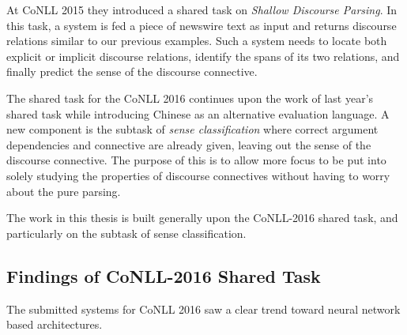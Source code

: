 At CoNLL 2015 they introduced a shared task on \emph{Shallow Discourse Parsing}. In this task, a system is fed a piece of newswire text as input and returns discourse relations similar to our previous examples. Such a system needs to locate both explicit or implicit discourse relations, identify the spans of its two relations, and finally predict the sense of the discourse connective.


The shared task for the CoNLL 2016 continues upon the work of last year's shared task while introducing Chinese as an alternative evaluation language. A new component is the subtask of \emph{sense classification} where correct argument dependencies and connective are already given, leaving out the sense of the discourse connective. The purpose of this is to allow more focus to be put into solely studying the properties of discourse connectives without having to worry about the pure parsing.

The work in this thesis is built generally upon the CoNLL-2016 shared task, and particularly on the subtask of sense classification.

\subsection{Findings of CoNLL-2016 Shared Task}

The submitted systems for CoNLL 2016 saw a clear trend toward neural network based architectures.

